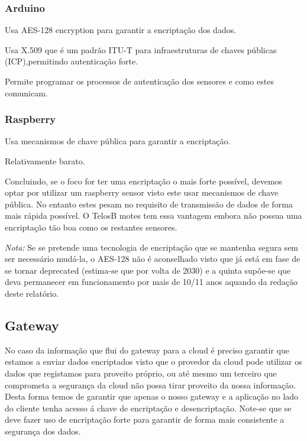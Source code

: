 \subsubsection{Arduino}
\par\hfill
\par Usa AES-128 encryption para garantir a encriptação dos dados.\newline
\par Usa X.509 que é um padrão ITU-T para infraestruturas de chaves públicas (ICP),permitindo autenticação forte.
\par Permite programar os processos de autenticação dos sensores e como estes comunicam. 

\subsubsection{Raspberry}
\par\hfill
\par Usa mecanismos de chave pública para garantir a encriptação.
\par Relativamente barato.\newline


\par Concluindo, se o foco for ter uma encriptação o mais forte possível, devemos optar por utilizar um raspberry sensor visto este usar mecanismos de chave pública. No entanto estes pesam no requisito de transmissão de dados de forma mais rápida possível. O TelosB motes tem essa vantagem embora não possua uma encriptação tão boa como os restantes sensores.\newline


\textit{Nota:} Se se pretende uma tecnologia de encriptação que se mantenha segura sem ser necessário mudá-la, o AES-128 não é aconselhado visto que já está em fase de se tornar deprecated (estima-se que por volta de 2030) e a quinta supõe-se que deva permanecer em funcionamento por mais de 10/11 anos aquando da redação deste relatório.\newline



\subsection{Gateway}
\par\hfill
\par No caso da informação que flui do gateway para a cloud é preciso garantir que estamos a enviar dados encriptados visto que o provedor da cloud pode utilizar os dados que registamos para proveito próprio, ou até mesmo um terceiro que comprometa a segurança da cloud não possa tirar proveito da nossa informação. Desta forma temos de garantir que apenas o nosso gateway e a aplicação no lado do cliente tenha acesso á chave de encriptação e desencriptação. Note-se que se deve fazer uso de encriptação forte para garantir de forma mais consistente a segurança dos dados.\newline

